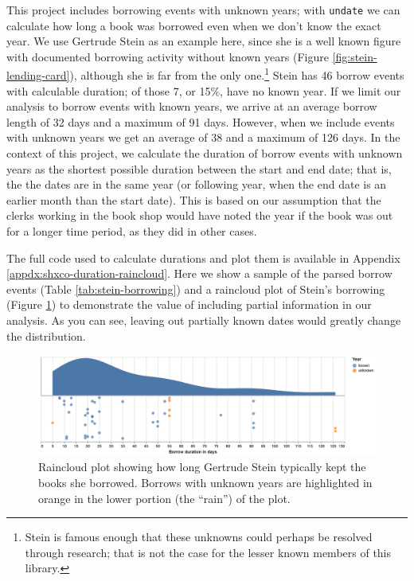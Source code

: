 \documentclass[final]{anthology-ch} %
\begin{document}
This project includes borrowing events with unknown years; with
\texttt{undate} we can calculate how long a book was borrowed even when
we don't know the exact year. We use Gertrude Stein as an example here, since she is a well known figure with documented borrowing activity without known years (Figure \ref{fig:stein-lending-card}), although she is far from the only one.\footnote{Stein is famous enough that these unknowns could perhaps be resolved through research; that is not the case for the lesser known members of this library.} Stein has 46 borrow events with calculable duration; of those 7, or 15\%, have no known year.  If we limit our analysis to borrow events with known years, we arrive at an average borrow length of 32 days and a maximum of 91 days. However, when we include events with unknown years we get an average of 38 and a maximum of 126 days. In the context of this project, we calculate the duration of borrow events with unknown years as the shortest possible duration between the start and end date; that is, the the dates are in the same year (or following year, when the end date is an earlier month than the start date). This is based on our assumption that the clerks working in the book shop would have noted the year if the book was out for a longer time period, as they did in other cases.

The full code used to calculate durations and plot them is available in Appendix \ref{appdx:shxco-duration-raincloud}.  Here we show a sample of the parsed borrow events (Table \ref{tab:stein-borrowing}) and a raincloud plot of Stein's borrowing (Figure \ref{fig:stein-borrow-raincloud}) to demonstrate the value of including partial information in our analysis. As you can see, leaving out partially known dates would greatly change the distribution. 


\begin{figure}[t!]
  \centering
  \includegraphics[width=\linewidth]{figures/shxco_stein_borrows.png}
  \caption{Raincloud plot showing how long Gertrude Stein typically kept the books
she borrowed.  Borrows with unknown years are highlighted in orange in the lower portion (the ``rain'') of the plot. }
  \label{fig:stein-borrow-raincloud}
\end{figure}
\end{document}
